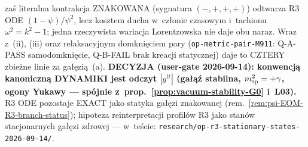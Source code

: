 \begin{remark}
za\'s literalna kontrakcja ZNAKOWANA (sygnatura $(-,+,+,+)$) odtwarza
R3 ODE $(1-\psi)/\psi^2$, lecz kosztem ducha w~cz\l{}onie czasowym
i~tachionu $\omega^2=k^2-1$; jedna rzeczywista wariacja Lorentzowska
nie daje obu naraz. Wraz z~(ii), (iii) oraz relaksacyjnym domkni\k{e}ciem
pary (\texttt{op-metric-pair-M911}: Q-A-PASS samodomkni\k{e}cie,
Q-B-FAIL brak kreacji statycznej) daje to CZTERY zbie\.zne linie za
ga\l{}\k{e}zi\k{a}~(a). \textbf{DECYZJA (user-gate 2026-09-14):
konwencj\k{a} kanoniczn\k{a} DYNAMIKI jest odczyt $|g^{tt}|$
(ga\l{}\k{a}\'z stabilna, $m_{\rm sp}^2=+\gamma$, ogony Yukawy ---
sp\'ojnie z~prop.~\ref{prop:vacuum-stability-G0} i~L03).} R3 ODE
pozostaje EXACT jako statyka ga\l{}\k{e}zi znakowanej
(rem.~\ref{rem:psi-EOM-R3-branch-status}); hipoteza reinterpretacji
profil\'ow R3 jako stan\'ow stacjonarnych ga\l{}\k{e}zi zdrowej ---
w~te\'scie: \texttt{research/op-r3-stationary-states-2026-09-14/}.
\end{remark}

